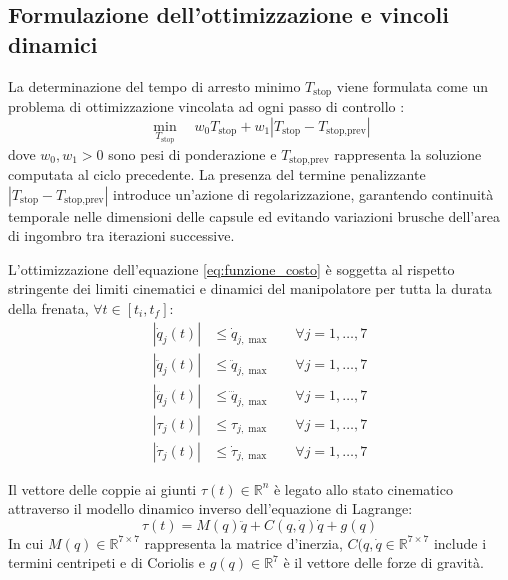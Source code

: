 \subsection{Formulazione dell'ottimizzazione e vincoli dinamici}
\label{subsec:optimization_problem}
La determinazione del tempo di arresto minimo $T_{\text{stop}}$ viene formulata come un problema di ottimizzazione vincolata ad ogni passo di controllo \cite{Scalera2024, Scalera2022}:
\begin{equation}
    \min_{T_{\text{stop}}} \quad w_0 T_{\text{stop}} + w_1 \left|T_{\text{stop}}-T_{\text{stop,prev}} \right|
    \label{eq:funzione_costo}
\end{equation}
dove $w_0, w_1 > 0$ sono pesi di ponderazione e $T_{\text{stop,prev}}$ rappresenta la soluzione computata al ciclo precedente. La presenza del termine penalizzante $|T_{\text{stop}} - T_{\text{stop,prev}}|$ introduce un'azione di regolarizzazione, garantendo continuità temporale nelle dimensioni delle capsule ed evitando variazioni brusche dell'area di ingombro tra iterazioni successive.

L'ottimizzazione dell'equazione \ref{eq:funzione_costo} è soggetta al rispetto stringente dei limiti cinematici e dinamici del manipolatore per tutta la durata della frenata, $\forall t \in [t_i, t_f]$:
\begin{align}
    |\dot{q}_j(t)| &\le \dot{q}_{j,\max} \quad &\forall j=1, \dots, 7 \label{eq:vel_lim}\\
    |\ddot{q}_j(t)| &\le \ddot{q}_{j,\max} \quad &\forall j=1, \dots, 7 \label{eq:acc_lim}\\
    |\dddot{q}_j(t)| &\le \dddot{q}_{j,\max} \quad &\forall j = 1, \dots, 7 \label{eq:jerk_lim}\\
    |\tau_j(t)| &\le \tau_{j,\max} \quad &\forall j = 1, \dots, 7 \label{eq:torque_lim}\\
    |\dot{\tau}_j(t)| &\le \dot{\tau}_{j,\max} \quad &\forall j = 1, \dots, 7 \label{eq:dtorque_lim}
\end{align}

Il vettore delle coppie ai giunti $\tau(t) \in \mathbb{R}^n$ è legato allo stato cinematico attraverso il modello dinamico inverso dell'equazione di Lagrange:
\begin{equation}
    \tau(t) = M(q)\ddot{q} + C(q, \dot{q})\dot{q} + g(q)
\end{equation}
In cui $M(q) \in \mathbb{R}^{7 \times 7}$ rappresenta la matrice d'inerzia, $C(q, \dot{q} \in \mathbb{R}^{7 \times 7}$ include i termini centripeti e di Coriolis e $g(q) \in \mathbb{R}^7$ è il vettore delle forze di gravità.

